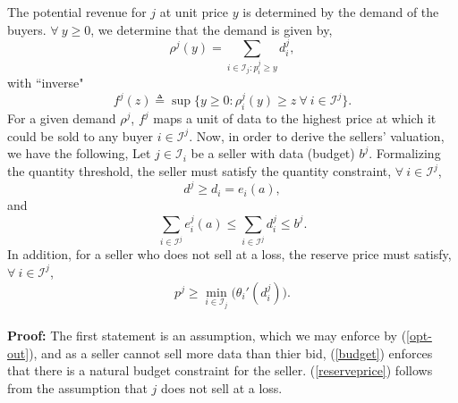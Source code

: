 \documentclass[12pt]{article}
\theoremstyle{definition}
\newcommand{\mcI}{\mathcal{I}}
\begin{document}
\begin{multicols}{2}
The potential revenue for $j$ at unit price $y$ is determined by the
demand of the buyers. $\forall \ y\ge 0$, we determine that the demand is given by,
\begin{equation}\label{datademand}
    \rho^j(y) = \sum_{i\in\mcI_j : p_i^j\ge y} d_i^j, 
\end{equation}
with ``inverse"
\begin{equation}\label{revenue}
    f^j(z) \triangleq \sup\big\lbrace y\ge 0:
        \rho_i^j(y) \ge z \ \forall \ i \in \mcI^j\big\rbrace.
\end{equation}
For a given demand $\rho^j$, $f^j$ maps a unit of data to the highest price at
which it could be sold to any buyer $i\in \mcI^j$.
Now, in order to derive the sellers' valuation, we have the following,
{
\label{constraints}
Let $j\in\mcI_i$ be a seller with data (budget) $b^j$.
Formalizing the quantity threshold, the seller must satisfy the quantity
constraint, $\forall \ i \in\mcI^j$,
\begin{equation}\label{quantity}
    d^j \ge d_i = e_i(a),
\end{equation}
and
\begin{equation}\label{budget}
    \displaystyle\sum_{i\in\mcI^j} e_i^j(a) \le \sum_{i\in\mcI^j} d^j_i \le b^j.
\end{equation}
In addition, for a seller who does not sell at a loss, the reserve price must
satisfy, $\forall \ i \in \mcI^j$,
\begin{equation}\label{reserveprice}
   p^j \ge \min_{i\in\mcI_j}\big({\theta_i}'(d_i^j)\big).
\end{equation}
}\\
\textbf{Proof:}
The first statement is an assumption, which we may enforce by (\ref{opt-out}),
and as a seller cannot sell more data than thier bid, (\ref{budget}) enforces
that there is a natural budget constraint for the seller. (\ref{reserveprice})
follows from the assumption that $j$ does not sell at a loss.


\end{multicols}
\end{document}
